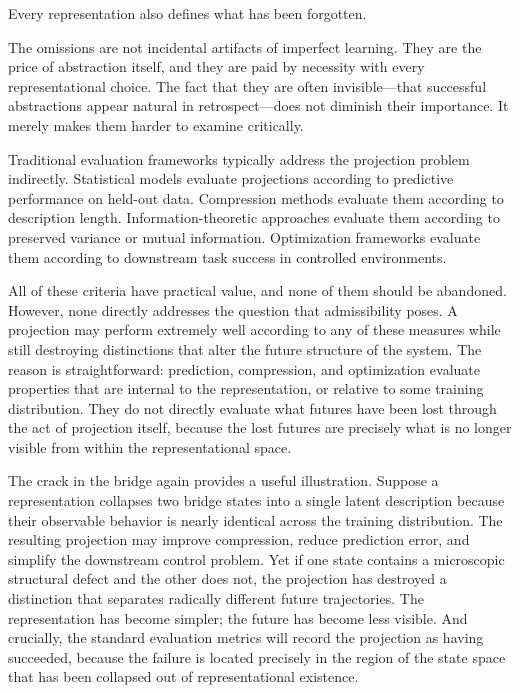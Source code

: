 \documentclass[12pt,a4paper]{article}
\theoremstyle{plain}
\theoremstyle{definition}
\theoremstyle{remark}
\begin{document}
Every representation also defines what has been forgotten.

The omissions are not incidental artifacts of imperfect learning. They are
the price of abstraction itself, and they are paid by necessity with every
representational choice. The fact that they are often invisible---that
successful abstractions appear natural in retrospect---does not diminish their
importance. It merely makes them harder to examine critically.

Traditional evaluation frameworks typically address the projection problem
indirectly. Statistical models evaluate projections according to predictive
performance on held-out data. Compression methods evaluate them according to
description length. Information-theoretic approaches evaluate them according
to preserved variance or mutual information. Optimization frameworks evaluate
them according to downstream task success in controlled environments.

All of these criteria have practical value, and none of them should be
abandoned. However, none directly addresses the question that admissibility
poses. A projection may perform extremely well according to any of these
measures while still destroying distinctions that alter the future structure
of the system. The reason is straightforward: prediction, compression, and
optimization evaluate properties that are internal to the representation, or
relative to some training distribution. They do not directly evaluate what
futures have been lost through the act of projection itself, because the
lost futures are precisely what is no longer visible from within the
representational space.

The crack in the bridge again provides a useful illustration. Suppose a
representation collapses two bridge states into a single latent description
because their observable behavior is nearly identical across the training
distribution. The resulting projection may improve compression, reduce
prediction error, and simplify the downstream control problem. Yet if one
state contains a microscopic structural defect and the other does not, the
projection has destroyed a distinction that separates radically different
future trajectories. The representation has become simpler; the future has
become less visible. And crucially, the standard evaluation metrics will
record the projection as having succeeded, because the failure is located
precisely in the region of the state space that has been collapsed out of
representational existence.
\end{document}
